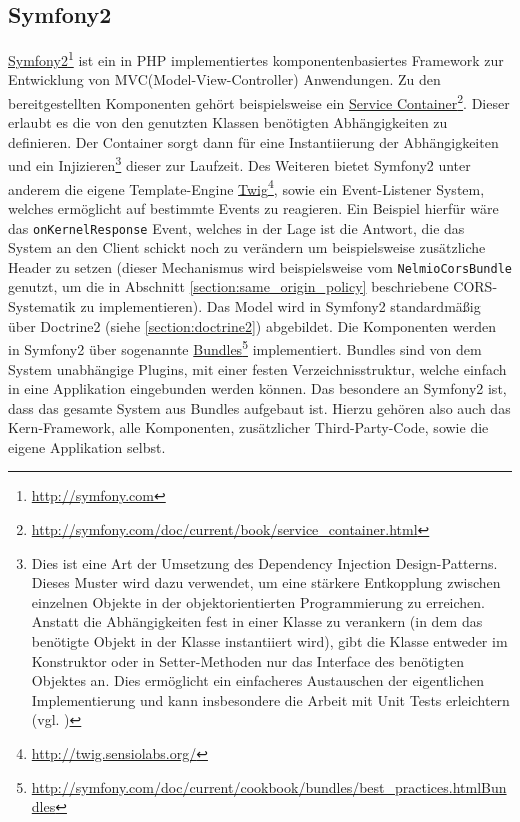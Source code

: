 \subsection{Symfony2}\label{section:symfony2}
\href{http://symfony.com}{Symfony2}\footnote{\url{http://symfony.com}} ist ein in PHP implementiertes komponentenbasiertes Framework zur Entwicklung von MVC(Model-View-Controller) Anwendungen. Zu den bereitgestellten Komponenten gehört beispielsweise ein \href{http://symfony.com/doc/current/book/service_container.html}{Service Container}\footnote{\url{http://symfony.com/doc/current/book/service_container.html}}. Dieser erlaubt es die von den genutzten Klassen benötigten Abhängigkeiten zu definieren. Der Container sorgt dann für eine Instantiierung der Abhängigkeiten und ein Injizieren\footnote{Dies ist eine Art der Umsetzung des Dependency Injection Design-Patterns. Dieses Muster wird dazu verwendet, um eine stärkere Entkopplung zwischen einzelnen Objekte in der objektorientierten Programmierung zu erreichen. Anstatt die Abhängigkeiten fest in einer Klasse zu verankern (in dem das benötigte Objekt in der Klasse instantiiert wird), gibt die Klasse entweder im Konstruktor oder in Setter-Methoden nur das Interface des benötigten Objektes an. Dies ermöglicht ein einfacheres Austauschen der eigentlichen Implementierung und kann insbesondere die Arbeit mit Unit Tests erleichtern (vgl. \cite{Fowler2004})} dieser zur Laufzeit. Des Weiteren bietet Symfony2 unter anderem die eigene Template-Engine \href{http://twig.sensiolabs.org/}{Twig}\footnote{\url{http://twig.sensiolabs.org/}}, sowie ein Event-Listener System, welches ermöglicht auf bestimmte Events zu reagieren. Ein Beispiel hierfür wäre das \texttt{onKernelResponse} Event, welches in der Lage ist die Antwort, die das System an den Client schickt noch zu verändern um beispielsweise zusätzliche Header zu setzen (dieser Mechanismus wird beispielsweise vom \texttt{NelmioCorsBundle} genutzt, um die in Abschnitt \ref{section:same_origin_policy} beschriebene CORS-Systematik zu implementieren). Das Model wird in Symfony2 standardmäßig über Doctrine2 (siehe \ref{section:doctrine2}) abgebildet.
Die Komponenten werden in Symfony2 über sogenannte \href{http://symfony.com/doc/current/cookbook/bundles/best_practices.htmlBundles}{Bundles}\footnote{\url{http://symfony.com/doc/current/cookbook/bundles/best_practices.htmlBundles}} implementiert. Bundles sind von dem System unabhängige Plugins, mit einer festen Verzeichnisstruktur, welche einfach in eine Applikation eingebunden werden können. Das besondere an Symfony2 ist, dass das gesamte System aus Bundles aufgebaut ist. Hierzu gehören also auch das Kern-Framework, alle Komponenten, zusätzlicher Third-Party-Code, sowie die eigene Applikation selbst.

